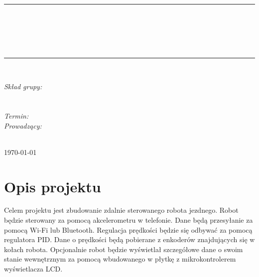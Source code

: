 \documentclass[10pt, a4paper]{article}
\begin{document}
\def\tablename{Tabela}	%

\begin{titlepage}
	\begin{center}
		\textsc{\LARGE \formakursu}\\[1cm]		
		\textsc{\Large \kurs}\\[0.5cm]		
		\rule{\textwidth}{0.08cm}\\[0.4cm]
		{\huge \bfseries \doctype}\\[1cm]
		{\huge \bfseries \projectname}\\[0.5cm]
		{\huge \bfseries \acronim}\\[0.4cm]
		\rule{\textwidth}{0.08cm}\\[1cm]
		
		\begin{flushright} \large
		\emph{Skład grupy:}\\
		\osobaA\\
		\osobaB\\[0.4cm]
		
		\emph{Termin: }\termin\\[0.4cm]

		\emph{Prowadzący:} \\
		\prowadzacy \\
		
		\end{flushright}
		
		\vfill
		
		{\large \today}
	\end{center}	
\end{titlepage}

\newpage
\tableofcontents
\newpage

\section{Opis projektu}
\label{sec:OpisProjektu}

Celem projektu jest zbudowanie zdalnie sterowanego robota jezdnego. Robot będzie sterowany za pomocą akcelerometru w telefonie. Dane będą przesyłanie za pomocą Wi-Fi lub Bluetooth. Regulacja prędkości będzie się odbywać za pomocą regulatora PID. Dane o prędkości będą pobierane z enkoderów znajdujących się w kołach robota. Opcjonalnie robot będzie wyświetlał szczegółowe dane o swoim stanie wewnętrznym za pomocą wbudowanego w płytkę z mikrokontrolerem wyświetlacza LCD.
\newline
\newline
\end{document}
